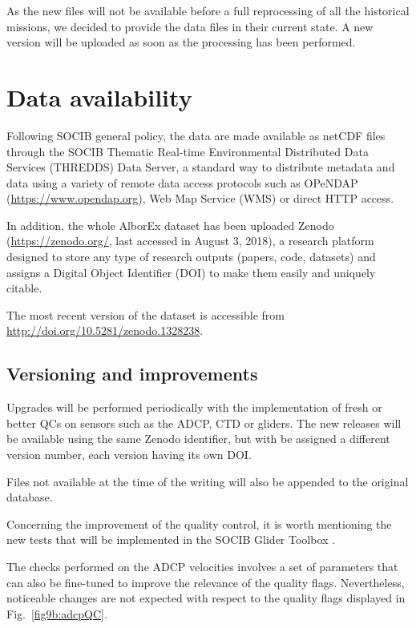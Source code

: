 \documentclass[essd]{copernicus}
\begin{document}
As the new files will not be available before a full reprocessing of all the historical missions, we decided to provide the data files in their current state. A new version will be uploaded as soon as the processing has been performed.

\section{Data availability}

Following SOCIB general policy, the data are made available as netCDF files through the SOCIB Thematic Real-time Environmental Distributed Data Services (THREDDS) Data Server, a standard way to distribute metadata and data using a variety of remote data access protocols such as OPeNDAP (\url{https://www.opendap.org}), Web Map Service (WMS) or direct HTTP access. 

In addition, the whole AlborEx dataset has been uploaded Zenodo (\url{https://zenodo.org/}, last accessed in August 3, 2018), a research platform designed to store any type of research outputs (papers, code, datasets) and assigns a Digital Object Identifier (DOI) to make them easily and uniquely citable.

The most recent version of the dataset is accessible from \url{http://doi.org/10.5281/zenodo.1328238}.

\subsection{Versioning and improvements}

Upgrades will be performed periodically with the implementation of fresh or better QCs on sensors such as the ADCP, CTD or gliders. The new releases will be available using the same Zenodo identifier, but with be assigned a different version number, each version having its own DOI. 

Files not available at the time of the writing will also be appended to the original database. 

Concerning the improvement of the quality control, it is worth mentioning the new tests that will be implemented in the SOCIB Glider Toolbox \citep{TROUPIN16}.

The checks performed on the ADCP velocities involves a set of parameters that can also be fine-tuned to improve the relevance of the quality flags. Nevertheless, noticeable changes are not expected with respect to the quality flags displayed in Fig.~\ref{fig9b:adcpQC}.
\end{document}
